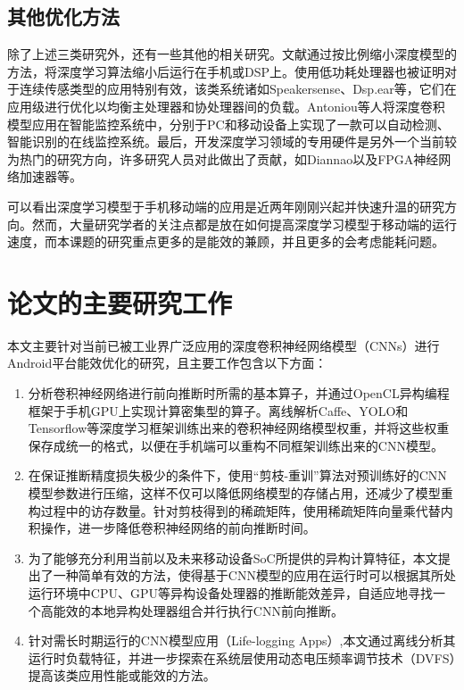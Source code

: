 \subsection{其他优化方法}
除了上述三类研究外，还有一些其他的相关研究。文献\cite{lane2015deepear,chen2014small,variani2014deep}通过按比例缩小深度模型的方法，将深度学习算法缩小后运行在手机或DSP上。使用低功耗处理器也被证明对于连续传感类型的应用特别有效，该类系统诸如Speakersense\cite{lu2011speakersense}、Dsp.ear\cite{georgiev2014dsp}等，它们在应用级进行优化以均衡主处理器和协处理器间的负载。Antoniou等人\cite{antoniou2016general}将深度卷积模型应用在智能监控系统中，分别于PC和移动设备上实现了一款可以自动检测、智能识别的在线监控系统。最后，开发深度学习领域的专用硬件是另外一个当前较为热门的研究方向，许多研究人员对此做出了贡献，如Diannao\cite{chen2014diannao}以及FPGA神经网络加速器\cite{zhang2015optimizing,wang2017dlau,yu2015deep,wang2016solar}等。

可以看出深度学习模型于手机移动端的应用是近两年刚刚兴起并快速升温的研究方向。然而，大量研究学者的关注点都是放在如何提高深度学习模型于移动端的运行速度，而本课题的研究重点更多的是能效的兼顾，并且更多的会考虑能耗问题。

\section{论文的主要研究工作}
本文主要针对当前已被工业界广泛应用的深度卷积神经网络模型（CNNs）进行Android平台能效优化的研究，且主要工作包含以下方面：
\begin{enumerate}
\item 分析卷积神经网络进行前向推断时所需的基本算子，并通过OpenCL异构编程框架于手机GPU上实现计算密集型的算子。离线解析Caffe、YOLO\cite{redmon2016you}和Tensorflow\cite{abadi2016tensorflow}等深度学习框架训练出来的卷积神经网络模型权重，并将这些权重保存成统一的格式，以便在手机端可以重构不同框架训练出来的CNN模型。
\item 在保证推断精度损失极少的条件下，使用“剪枝-重训”算法对预训练好的CNN模型参数进行压缩，这样不仅可以降低网络模型的存储占用，还减少了模型重构过程中的访存数量。针对剪枝得到的稀疏矩阵，使用稀疏矩阵向量乘代替内积操作，进一步降低卷积神经网络的前向推断时间。
\item 为了能够充分利用当前以及未来移动设备SoC所提供的异构计算特征，本文提出了一种简单有效的方法，使得基于CNN模型的应用在运行时可以根据其所处运行环境中CPU、GPU等异构设备处理器的推断能效差异，自适应地寻找一个高能效的本地异构处理器组合并行执行CNN前向推断。
\item 针对需长时期运行的CNN模型应用（Life-logging Apps）,本文通过离线分析其运行时负载特征，并进一步探索在系统层使用动态电压频率调节技术（DVFS）提高该类应用性能或能效的方法。
\end{enumerate}


